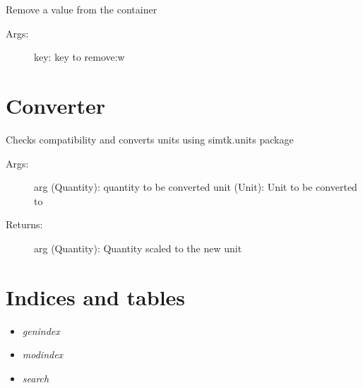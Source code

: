 \documentclass[letterpaper,10pt,english]{sphinxmanual}
\begin{document}
\begin{fulllineitems}
\begin{fulllineitems}
\begin{description}
\end{description}

\end{fulllineitems}



\begin{fulllineitems}
\label{orderedSet:ctools.OrderedSet.OrderedSet.remove}
Remove a value from the container
\begin{description}
\item[{Args:}] \leavevmode
key: key to remove:w

\end{description}

\end{fulllineitems}


\end{fulllineitems}



\chapter{Converter}
\label{converter:module-ctools.Converter}\label{converter::doc}\label{converter:converter}
\label{converter:module-ctools.Converter}

\begin{fulllineitems}
\label{converter:ctools.Converter.convert_units}
Checks compatibility and converts units using simtk.units package
\begin{description}
\item[{Args:}] \leavevmode
arg (Quantity): quantity to be converted
unit (Unit): Unit to be converted to

\item[{Returns:}] \leavevmode
arg (Quantity): Quantity scaled to the new unit

\end{description}

\end{fulllineitems}



\chapter{Indices and tables}
\label{index:indices-and-tables}\begin{itemize}
\item {} 
\emph{genindex}

\item {} 
\emph{modindex}

\item {} 
\emph{search}

\end{itemize}
\end{document}
